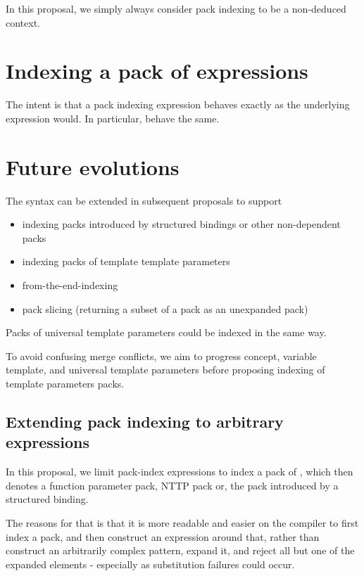 \documentclass{wg21}
\begin{document}
In this proposal, we simply always consider pack indexing to be a non-deduced context.


\section{Indexing a pack of expressions}

The intent is that a pack indexing expression behaves exactly as the underlying expression would.
In particular,  behave the same.

\section{Future evolutions}

The syntax can be extended in subsequent proposals to support

\begin{itemize}
\item indexing packs introduced by structured bindings or other non-dependent packs
\item indexing packs of template template parameters
\item from-the-end-indexing
\item pack slicing (returning a subset of a pack as an unexpanded pack)
\end{itemize}
Packs of universal template parameters could be indexed in the same way.

To avoid confusing merge conflicts, we aim to progress concept, variable template, and universal
template parameters before proposing indexing of template parameters packs.

\subsection{Extending pack indexing to arbitrary expressions}

In this proposal, we limit pack-index expressions to index a pack of ,
which then denotes a function parameter pack, NTTP pack or, the pack introduced by a structured binding.

The reasons for that is that it is more readable and easier on the compiler to first index a pack,
and then construct an expression around that, rather than construct an arbitrarily complex pattern,
expand it, and reject all but one of the expanded elements - especially as substitution failures could occur.
\end{document}
